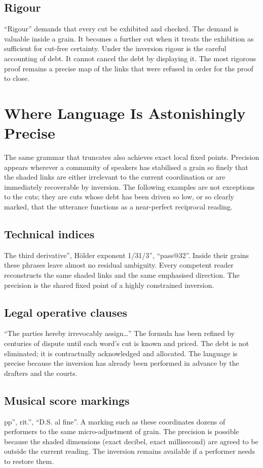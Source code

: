 \documentclass[11pt,a4paper]{article}
\begin{document}
\subsection{Rigour} ``Rigour'' demands that every cut be exhibited and checked. The demand is valuable inside a grain. It becomes a further cut when it treats the exhibition as sufficient for cut-free certainty. Under the inversion rigour is the careful accounting of debt. It cannot cancel the debt by displaying it. The most rigorous proof remains a precise map of the links that were refused in order for the proof to close.

\section{Where Language Is Astonishingly Precise}

The same grammar that truncates also achieves exact local fixed points. Precision appears wherever a community of speakers has stabilised a grain so finely that the shaded links are either irrelevant to the current coordination or are immediately recoverable by inversion. The following examples are not exceptions to the cuts; they are cuts whose debt has been driven so low, or so clearly marked, that the utterance functions as a near-perfect reciprocal reading.

\subsection{Technical indices} The third derivative'', Hölder exponent 1/31/3'', ``pass@32''. Inside their grains these phrases leave almost no residual ambiguity. Every competent reader reconstructs the same shaded links and the same emphasised direction. The precision is the shared fixed point of a highly constrained inversion.

\subsection{Legal operative clauses} ``The parties hereby irrevocably assign\ldots'' The formula has been refined by centuries of dispute until each word’s cut is known and priced. The debt is not eliminated; it is contractually acknowledged and allocated. The language is precise because the inversion has already been performed in advance by the drafters and the courts.

\subsection{Musical score markings} pp'', rit.'', ``D.S. al fine''. A marking such as these coordinates dozens of performers to the same micro-adjustment of grain. The precision is possible because the shaded dimensions (exact decibel, exact millisecond) are agreed to be outside the current reading. The inversion remains available if a performer needs to restore them.
\end{document}
